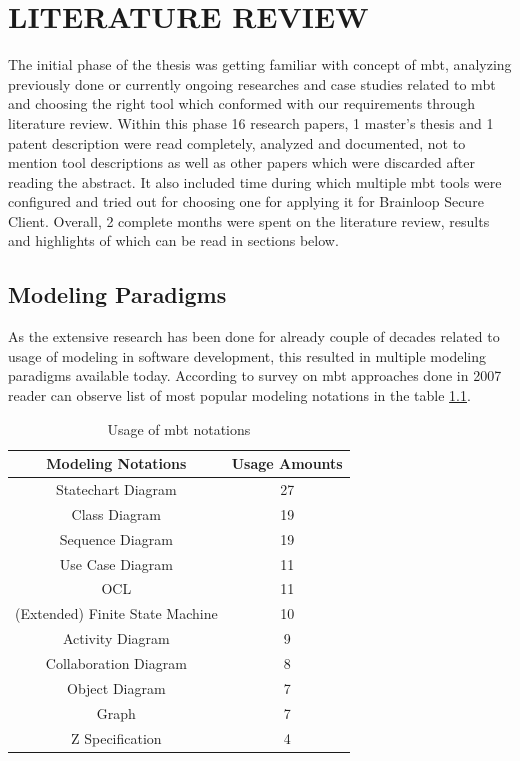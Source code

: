 \chapter{LITERATURE REVIEW}
\label{chapter:literature_review}

\par
The initial phase of the thesis was getting familiar with concept of \acrshort{mbt}, analyzing previously done or currently ongoing researches and case studies related to \acrshort{mbt} and choosing the right tool which conformed with our requirements through literature review. Within this phase 16 research papers, 1 master's thesis and 1 patent description were read completely, analyzed and documented, not to mention tool descriptions as well as other papers which were discarded after reading the abstract. It also included time during which multiple \acrshort{mbt} tools were configured and tried out for choosing one for applying it for Brainloop Secure Client. Overall, 2 complete months were spent on the literature review, results and highlights of which can be read in sections below.

\section{Modeling Paradigms}

\par
As the extensive research has been done for already couple of decades related to usage of modeling in software development, this resulted in multiple modeling paradigms available today. According to survey on \acrshort{mbt} approaches done in 2007 \cite{Survey} reader can observe list of most popular modeling notations in the table \ref{tab:Usage_Survey}. 

\begin{table}[]
    \centering
    \begin{tabular}{|c|c|}
        \hline
        Modeling Notations & Usage Amounts \\
        \hline
        Statechart Diagram & 27 \\
        \hline
        Class Diagram & 19 \\
        \hline
        Sequence Diagram & 19 \\
        \hline
        Use Case Diagram & 11 \\
        \hline
        OCL & 11 \\
        \hline
        (Extended) Finite State Machine & 10 \\
        \hline
        Activity Diagram & 9 \\
        \hline
        Collaboration Diagram & 8 \\
        \hline
        Object Diagram & 7 \\
        \hline
        Graph & 7 \\
        \hline
        Z Specification & 4 \\
        \hline
    \end{tabular}
    \caption{Usage of \acrshort{mbt} notations \cite{Survey}}
    \label{tab:Usage_Survey}
\end{table}

